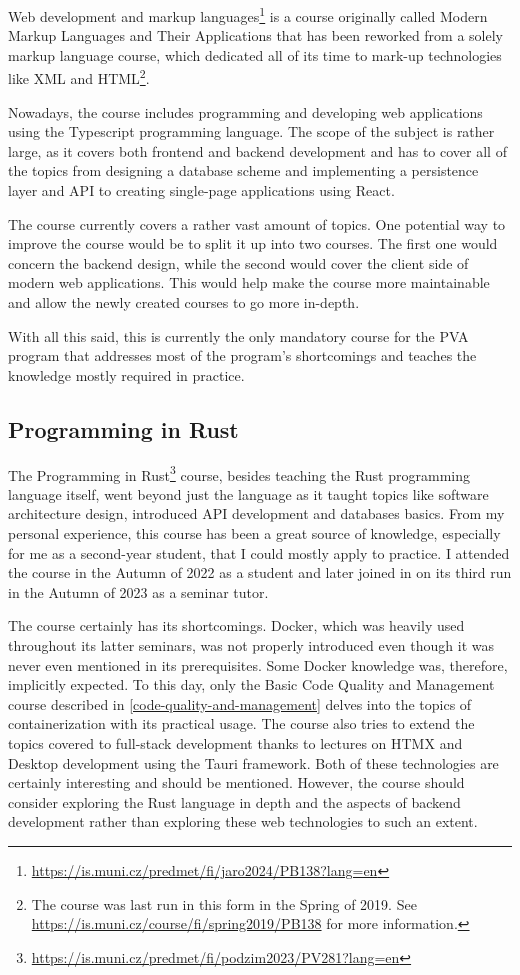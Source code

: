 \documentclass[
  digital,
  color,
  oneside,
  nosansbold,
  nocolorbold,
  lof,
  nolot,
]{fithesis4}
\begin{document}
Web development and markup languages\footnote{\url{https://is.muni.cz/predmet/fi/jaro2024/PB138?lang=en}}
is a course originally called Modern Markup Languages and Their Applications that has been reworked from a solely markup language course, which dedicated all of its time to mark-up technologies like XML and HTML\footnote{The course was last run in this form in the Spring of 2019. See \url{https://is.muni.cz/course/fi/spring2019/PB138} for more information.}.

Nowadays, the course includes programming and developing web applications using the Typescript programming language. The scope of the subject is rather large, as it covers both frontend and backend development and has to cover all of the topics from designing a database scheme and implementing a persistence layer and API to creating single-page applications using React.

The course currently covers a rather vast amount of topics. One potential way to improve the course would be to split it up into two courses. The first one would concern the backend design, while the second would cover the client side of modern web applications. This would help make the course more maintainable and allow the newly created courses to go more in-depth.

With all this said, this is currently the only mandatory course for the PVA program that addresses most of the program's shortcomings and teaches the knowledge mostly required in practice.

\subsection{Programming in Rust}\label{rust-course}

The Programming in Rust\footnote{\url{https://is.muni.cz/predmet/fi/podzim2023/PV281?lang=en}} course, besides teaching the Rust programming language itself, went beyond just the language as it taught topics like software architecture design, introduced API development and databases basics. From my personal experience, this course has been a great source of knowledge, especially for me as a second-year student, that I could mostly apply to practice. I attended the course in the Autumn of 2022 as a student and later joined in on its third run in the Autumn of 2023 as a seminar tutor.

The course certainly has its shortcomings. Docker\cite{docker}, which was heavily used throughout its latter seminars, was not properly introduced even though it was never even mentioned in its prerequisites. Some Docker knowledge was, therefore, implicitly expected. To this day, only the Basic Code Quality and Management course described in \cref{code-quality-and-management} delves into the topics of containerization with its practical usage. The course also tries to extend the topics covered to full-stack development thanks to lectures on HTMX\cite{bigskysoftware-htmx} and Desktop development using the Tauri framework\cite{tauri-apps-tauri}. Both of these technologies are certainly interesting and should be mentioned. However, the course should consider exploring the Rust language in depth and the aspects of backend development rather than exploring these web technologies to such an extent.
\end{document}
